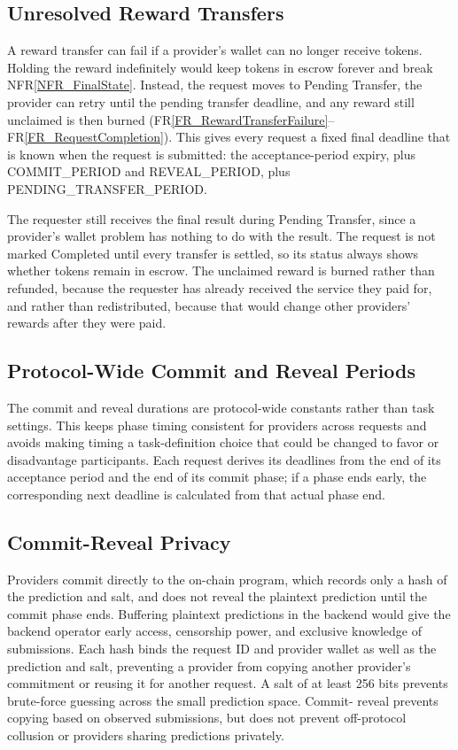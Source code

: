 \documentclass[12pt]{article}
\newcommand{\rref}[1]{FR\ref{#1}}
\newcommand{\nfrref}[1]{NFR\ref{#1}}
\begin{document}
\subsection{Unresolved Reward Transfers}

A reward transfer can fail if a provider's wallet can no longer receive tokens.
Holding the reward indefinitely would keep tokens in escrow forever and break
\nfrref{NFR_FinalState}. Instead, the request moves to Pending Transfer, the
provider can retry until the pending transfer deadline, and any reward still
unclaimed is then burned (\rref{FR_RewardTransferFailure}--\rref{FR_RequestCompletion}).
This gives every request a fixed final deadline that is known when the request
is submitted: the acceptance-period expiry, plus COMMIT\_PERIOD and REVEAL\_PERIOD, plus
PENDING\_TRANSFER\_PERIOD.

The requester still receives the final result during Pending Transfer, since a
provider's wallet problem has nothing to do with the result. The request is not
marked Completed until every transfer is settled, so its status always shows
whether tokens remain in escrow. The unclaimed reward is burned rather than
refunded, because the requester has already received the service they paid for,
and rather than redistributed, because that would change other providers'
rewards after they were paid.

\subsection{Protocol-Wide Commit and Reveal Periods}

The commit and reveal durations are protocol-wide constants rather than task
settings. This keeps phase timing consistent for providers across requests and
avoids making timing a task-definition choice that could be changed to favor or
disadvantage participants. Each request derives its deadlines from the end of
its acceptance period and the end of its commit phase; if a phase ends early,
the corresponding next deadline is calculated from that actual phase end.

\subsection{Commit-Reveal Privacy}

Providers commit directly to the on-chain program, which records only a hash of the prediction and salt, and does not reveal the plaintext prediction
until the commit phase ends. Buffering plaintext predictions in the backend
would give the backend operator early access, censorship power, and exclusive
knowledge of submissions. Each hash binds the request ID and provider wallet
as well as the prediction and salt, preventing a provider from copying another
provider's commitment or reusing it for another request. A salt of at least 256
bits prevents brute-force guessing across the small prediction space. Commit-
reveal prevents copying based on observed submissions, but does not prevent
off-protocol collusion or providers sharing predictions privately.
\end{document}
